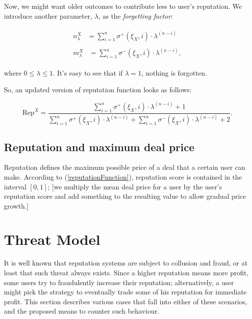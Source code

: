 \documentclass[11pt]{article}
\begin{document}
Now, we might want older outcomes to contribute less to user's reputation. We introduce another parameter, $ \lambda $, as the \textit{forgetting factor}:

\begin{align}
\begin{split}
n_{\lambda}^{X} {}& = \sum_{i = 1}^{n} \sigma^{+}(\xi_X, i) \cdot \lambda^{(n - i)}
\end{split} \\
\begin{split}
m_{\lambda}^{X} {}& = \sum_{i = 1}^{n} \sigma^{-}(\xi_X, i) \cdot \lambda^{(n - i)},
\end{split}
\end{align}

where $ 0 \leq \lambda \leq 1 $. It's easy to see that if $ \lambda = 1 $, nothing is forgotten.

So, an updated version of reputation function looks as follows:

\begin{equation} \label{reputationFunction}
\text{Rep}^{X} = \frac{\sum_{i = 1}^{n} \sigma^{+}(\xi_X, i) \cdot \lambda^{(n - i)} + 1}{\sum_{i = 1}^{n} \sigma^{+}(\xi_X, i) \cdot \lambda^{(n - i)} + \sum_{i = 1}^{n} \sigma^{-}(\xi_X, i) \cdot \lambda^{(n - i)} + 2}.
\end{equation}

\bigskip

\subsection{Reputation and maximum deal price} \label{reputation:maxDealprice}

Reputation defines the maximum possible price of a deal that a certain user can make. According to (\ref{reputationFunction}), reputation score is contained in the interval $ [0, 1] $; [we multiply the mean deal price for a user by the user's reputation score and add something to the resulting value to allow gradual price growth.]

\section{Threat Model} \label{threatModel}

It is well known \cite{ciccarelli2011collusion, maranzato2010fraud} that reputation systems are subject to collusion and fraud, or at least that such threat always exists. Since a higher reputation means more profit, some users try to fraudulently increase their reputation; alternatively, a user might 
pick the strategy to eventually trade some of his reputation for immediate profit. This section describes various cases that fall into either of these scenarios, and the proposed means to counter such behaviour.
\end{document}
